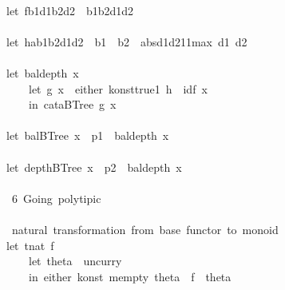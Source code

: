 \documentclass[a4paper]{article}
\begin{document}
\begin{tabbing}
\ttfamily ~\\
\ttfamily ~let~fb1d1b2d2~~b1b2d1d2\\
\ttfamily ~\\
\ttfamily ~let~hab1b2d1d2~~b1~~b2~~absd1d211max~d1~d2\\
\ttfamily ~\\
\ttfamily ~let~baldepth~x~~\\
\ttfamily ~~~~~let~g~x~~either~konsttrue1~h~~idf~x~\\
\ttfamily ~~~~~in~cataBTree~g~x\\
\ttfamily ~\\
\ttfamily ~let~balBTree~x~~p1~~baldepth~x\\
\ttfamily ~\\
\ttfamily ~let~depthBTree~x~~p2~~baldepth~x\\
\ttfamily ~\\
\ttfamily ~~6~Going~polytipic~\\
\ttfamily ~\\
\ttfamily ~~natural~transformation~from~base~functor~to~monoid\\
\ttfamily ~let~tnat~f~\\
\ttfamily ~~~~~let~theta~~uncurry~\\
\ttfamily ~~~~~in~either~konst~mempty~theta~~f~~theta\\

\end{tabbing}
\end{document}
